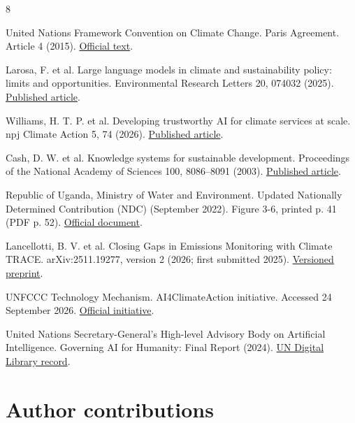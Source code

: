 \documentclass[11pt]{article}
\begin{document}
\begin{thebibliography}{8}

United Nations Framework Convention on Climate Change. Paris Agreement. Article 4 (2015). \href{https://unfccc.int/sites/default/files/english_paris_agreement.pdf}{Official text}.

Larosa, F. et al. Large language models in climate and sustainability policy: limits and opportunities. Environmental Research Letters 20, 074032 (2025). \href{https://doi.org/10.1088/1748-9326/addd36}{Published article}.

Williams, H. T. P. et al. Developing trustworthy AI for climate services at scale. npj Climate Action 5, 74 (2026). \href{https://doi.org/10.1038/s44168-026-00420-z}{Published article}.

Cash, D. W. et al. Knowledge systems for sustainable development. Proceedings of the National Academy of Sciences 100, 8086--8091 (2003). \href{https://doi.org/10.1073/pnas.1231332100}{Published article}.

Republic of Uganda, Ministry of Water and Environment. Updated Nationally Determined Contribution (NDC) (September 2022). Figure 3-6, printed p. 41 (PDF p. 52). \href{https://unfccc.int/sites/default/files/NDC/2022-09/Updated\%20NDC\%20_Uganda_2022\%20Final.pdf}{Official document}.

Lancellotti, B. V. et al. Closing Gaps in Emissions Monitoring with Climate TRACE. arXiv:2511.19277, version 2 (2026; first submitted 2025). \href{https://arxiv.org/abs/2511.19277v2}{Versioned preprint}.

UNFCCC Technology Mechanism. AI4ClimateAction initiative. Accessed 24 September 2026. \href{https://unfccc.int/ttclear/artificial_intelligence}{Official initiative}.

United Nations Secretary-General's High-level Advisory Body on Artificial Intelligence. Governing AI for Humanity: Final Report (2024). \href{https://digitallibrary.un.org/record/4062495}{UN Digital Library record}.

\end{thebibliography}

\section*{Author contributions}
\end{document}
